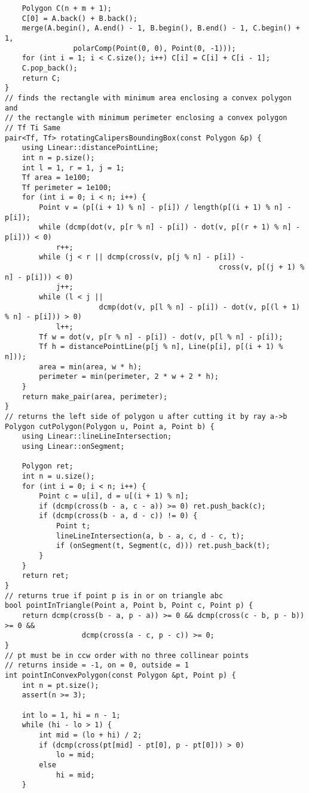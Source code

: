 \documentclass[FSZ,a4paper,onesided]{article}
\begin{document}
\begin{multicols*}{\COLS}
\begin{lstlisting}
    Polygon C(n + m + 1);
    C[0] = A.back() + B.back();
    merge(A.begin(), A.end() - 1, B.begin(), B.end() - 1, C.begin() + 1,
                polarComp(Point(0, 0), Point(0, -1)));
    for (int i = 1; i < C.size(); i++) C[i] = C[i] + C[i - 1];
    C.pop_back();
    return C;
}
// finds the rectangle with minimum area enclosing a convex polygon and
// the rectangle with minimum perimeter enclosing a convex polygon
// Tf Ti Same
pair<Tf, Tf> rotatingCalipersBoundingBox(const Polygon &p) {
    using Linear::distancePointLine;
    int n = p.size();
    int l = 1, r = 1, j = 1;
    Tf area = 1e100;
    Tf perimeter = 1e100;
    for (int i = 0; i < n; i++) {
        Point v = (p[(i + 1) % n] - p[i]) / length(p[(i + 1) % n] - p[i]);
        while (dcmp(dot(v, p[r % n] - p[i]) - dot(v, p[(r + 1) % n] - p[i])) < 0)
            r++;
        while (j < r || dcmp(cross(v, p[j % n] - p[i]) -
                                                  cross(v, p[(j + 1) % n] - p[i])) < 0)
            j++;
        while (l < j ||
                      dcmp(dot(v, p[l % n] - p[i]) - dot(v, p[(l + 1) % n] - p[i])) > 0)
            l++;
        Tf w = dot(v, p[r % n] - p[i]) - dot(v, p[l % n] - p[i]);
        Tf h = distancePointLine(p[j % n], Line(p[i], p[(i + 1) % n]));
        area = min(area, w * h);
        perimeter = min(perimeter, 2 * w + 2 * h);
    }
    return make_pair(area, perimeter);
}
// returns the left side of polygon u after cutting it by ray a->b
Polygon cutPolygon(Polygon u, Point a, Point b) {
    using Linear::lineLineIntersection;
    using Linear::onSegment;

    Polygon ret;
    int n = u.size();
    for (int i = 0; i < n; i++) {
        Point c = u[i], d = u[(i + 1) % n];
        if (dcmp(cross(b - a, c - a)) >= 0) ret.push_back(c);
        if (dcmp(cross(b - a, d - c)) != 0) {
            Point t;
            lineLineIntersection(a, b - a, c, d - c, t);
            if (onSegment(t, Segment(c, d))) ret.push_back(t);
        }
    }
    return ret;
}
// returns true if point p is in or on triangle abc
bool pointInTriangle(Point a, Point b, Point c, Point p) {
    return dcmp(cross(b - a, p - a)) >= 0 && dcmp(cross(c - b, p - b)) >= 0 &&
                  dcmp(cross(a - c, p - c)) >= 0;
}
// pt must be in ccw order with no three collinear points
// returns inside = -1, on = 0, outside = 1
int pointInConvexPolygon(const Polygon &pt, Point p) {
    int n = pt.size();
    assert(n >= 3);

    int lo = 1, hi = n - 1;
    while (hi - lo > 1) {
        int mid = (lo + hi) / 2;
        if (dcmp(cross(pt[mid] - pt[0], p - pt[0])) > 0)
            lo = mid;
        else
            hi = mid;
    }


\end{lstlisting}
\end{multicols*}
\end{document}
